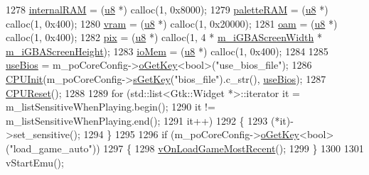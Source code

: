 \begin{DoxyCode}
1278   \mbox{\hyperlink{_globals_8cpp_ab4b8589b867755e0a00a7f9bd1993cb8}{internalRAM}} = (\mbox{\hyperlink{_system_8h_aed742c436da53c1080638ce6ef7d13de}{u8}} *) calloc(1, 0x8000);
1279   \mbox{\hyperlink{_globals_8cpp_aea0283719ad27328f3cf5f883f58813e}{paletteRAM}}  = (\mbox{\hyperlink{_system_8h_aed742c436da53c1080638ce6ef7d13de}{u8}} *) calloc(1, 0x400);
1280   \mbox{\hyperlink{_globals_8cpp_a983f8cd19ae66ea98e180c2e13bee5b9}{vram}}        = (\mbox{\hyperlink{_system_8h_aed742c436da53c1080638ce6ef7d13de}{u8}} *) calloc(1, 0x20000);
1281   \mbox{\hyperlink{_globals_8cpp_ad09c638952cf2ac6103cfda7992422a7}{oam}}         = (\mbox{\hyperlink{_system_8h_aed742c436da53c1080638ce6ef7d13de}{u8}} *) calloc(1, 0x400);
1282   \mbox{\hyperlink{_g_b_8cpp_a5ee6554b606dcde59ac92578b33776d0}{pix}}         = (\mbox{\hyperlink{_system_8h_aed742c436da53c1080638ce6ef7d13de}{u8}} *) calloc(1, 4 * \mbox{\hyperlink{class_v_b_a_1_1_window_a9a7257c8edba5383674c7a7eea250679}{m\_iGBAScreenWidth}} * 
      \mbox{\hyperlink{class_v_b_a_1_1_window_a5029d02ff8ee7d81fa7e9ad210d537d6}{m\_iGBAScreenHeight}});
1283   \mbox{\hyperlink{_globals_8cpp_a86abaf8d621ebe2fe5ed1ef5c7dd7ffd}{ioMem}}       = (\mbox{\hyperlink{_system_8h_aed742c436da53c1080638ce6ef7d13de}{u8}} *) calloc(1, 0x400);
1284 
1285   \mbox{\hyperlink{gb_globals_8h_ac2e7c0a19c3be95f9226870ca6875c8b}{useBios}} = m\_poCoreConfig->\mbox{\hyperlink{class_v_b_a_1_1_config_1_1_section_ab169d7aae4e9dde91418ba1668e3ad39}{oGetKey}}<\textcolor{keywordtype}{bool}>(\textcolor{stringliteral}{"use\_bios\_file"});
1286   \mbox{\hyperlink{_g_b_a_8cpp_a19d66b06024f86a38f4df435e5b975fc}{CPUInit}}(m\_poCoreConfig->\mbox{\hyperlink{class_v_b_a_1_1_config_1_1_section_a7ac9dfabf38bc1db83a6017e130f04ac}{sGetKey}}(\textcolor{stringliteral}{"bios\_file"}).c\_str(), \mbox{\hyperlink{gb_globals_8h_ac2e7c0a19c3be95f9226870ca6875c8b}{useBios}});
1287   \mbox{\hyperlink{_g_b_a_8cpp_a0e28c45345553e3693144745c12aff9b}{CPUReset}}();
1288 
1289   \textcolor{keywordflow}{for} (std::list<Gtk::Widget *>::iterator it = m\_listSensitiveWhenPlaying.begin();
1290        it != m\_listSensitiveWhenPlaying.end();
1291        it++)
1292   \{
1293     (*it)->set\_sensitive();
1294   \}
1295 
1296   \textcolor{keywordflow}{if} (m\_poCoreConfig->\mbox{\hyperlink{class_v_b_a_1_1_config_1_1_section_ab169d7aae4e9dde91418ba1668e3ad39}{oGetKey}}<\textcolor{keywordtype}{bool}>(\textcolor{stringliteral}{"load\_game\_auto"}))
1297   \{
1298     \mbox{\hyperlink{class_v_b_a_1_1_window_ac73a836767434700186832ae1ea49cc5}{vOnLoadGameMostRecent}}();
1299   \}
1300 
1301   vStartEmu();

\end{DoxyCode}
